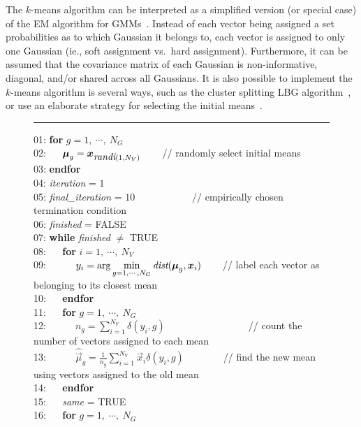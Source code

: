 The $k$-means algorithm can be interpreted as a simplified version (or special case) of the EM algorithm for GMMs~\cite{Kulis_2012}.
Instead of each vector being assigned a set probabilities as to which Gaussian it belongs to,
each vector is assigned to only one Gaussian (ie., soft assignment vs.~hard assignment).
Furthermore, it can be assumed that the covariance matrix of each Gaussian is non-informative, diagonal, and/or shared across all Gaussians.
It is also possible to implement the $k$-means algorithm is several ways,
such as the cluster splitting LBG algorithm~\cite{Linde80},
or use an elaborate strategy for selecting the initial means~\cite{Arthur_2007}.

\begin{figure}[!b]
\hrule
\vspace{0.5ex}
\begin{small}
\begin{tabbing}
01: {\bf for} $g=1, ~\cdots, ~N_G$ \\
02: ~~ $\Vec{\mu}_g = \Vec{x}_{ \mbox{\it randi}(1, N_V) } $ ~~~ {\small // randomly select initial means} \\
03: {\bf endfor} \\
04: {\it iteration} = $1$ \\
05: {\it final\_iteration} = $10$ ~~~ ~~~ ~~~ {\small // empirically chosen termination condition} \\
06: {\it finished} = FALSE \\
07: {\bf while} {\it finished} $\neq$ TRUE \\
08: ~~ {\bf for} $i=1, ~\cdots, ~N_V$ \\
09: ~~ ~~ \( y_i = {\displaystyle \arg \min_{g=1, \cdots, N_G}} \operatorname{\mbox{\it dist}}(\Vec{\mu}_g, \Vec{x}_i) \) ~~~ {\small // label each vector as belonging to its closest mean} \\
10: ~~ {\bf endfor} \\
11: ~~ {\bf for} $g=1, ~\cdots, ~N_G$ \\
12: ~~ ~~ $n_g = \sum\nolimits_{i=1}^{N_V} \delta(y_i, g) $  ~~~ ~~~ ~~~ ~~~ ~ {\small // count the number of vectors assigned to each mean} \\
13: ~~ ~~ $\widehat{\Vec{\mu}}_g = \frac{1}{n_g} \sum\nolimits_{i=1}^{N_V} \Vec{x}_i \delta(y_i, g) $ ~~~ ~~~ {\small // find the new mean using vectors assigned to the old mean} \\
14: ~~ {\bf endfor} \\
15: ~~ {\it same} = TRUE \\
16: ~~ {\bf for} $g=1, ~\cdots, ~N_G$ \\

\end{tabbing}
\end{small}
\end{figure}
